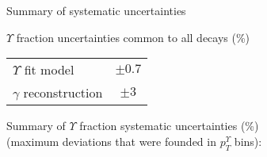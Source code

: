 \begin{frame}{Summary of systematic uncertainties}
\begin{center}
$\Upsilon$ fraction uncertainties common to all \chib decays (\%)
\begin{tabular}{lc}
\toprule
$\Upsilon$ fit model & $\pm 0.7$ \\
$\gamma$ reconstruction & $\pm 3$ \\
\bottomrule
\end{tabular}
\bigskip

Summary of $\Upsilon$ fraction systematic uncertainties (\%)\\
(maximum deviations that were founded in $p_T^{\Upsilon}$ bins):

\end{center}
\end{frame}